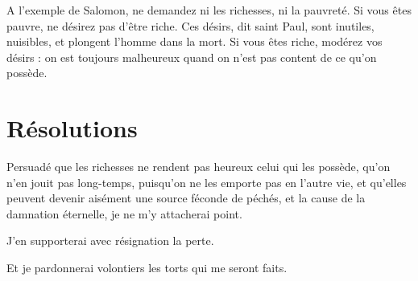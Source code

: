 \documentclass[instructions.tex]{subfiles}
\begin{document}
A l’exemple de Salomon, ne demandez ni les richesses, ni la pauvreté. Si vous êtes pauvre, ne désirez pas d’être riche. Ces désirs, dit saint Paul, sont inutiles, nuisibles, et plongent l’homme dans la mort. Si vous êtes riche, modérez vos désirs : on est toujours malheureux quand on n’est pas content de ce qu’on possède.
 
\section{Résolutions}
 
\primo Persuadé que les richesses ne rendent pas heureux celui qui les possède, qu’on n’en jouit pas long-temps, puisqu’on ne les emporte pas en l’autre vie, et qu’elles peuvent devenir aisément une source féconde de péchés, et la cause de la damnation éternelle, je ne m’y attacherai point. 

\secundo J’en supporterai avec résignation la perte. 

\tertio Et je pardonnerai volontiers les torts qui me seront faits. 

 
\end{document}
